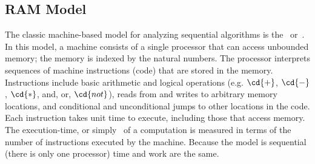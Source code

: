 \subsection{RAM Model}
\label{sec:analysis::models::ram-model}

\begin{cluster}
\label{grp:grm:analysis::models::classic}

\begin{gram}
\label{grm:analysis::models::classic}
The classic machine-based model for analyzing sequential algorithms is
the~ or~.
In this model, a machine consists of a single processor that can
access unbounded memory; the memory is indexed by the natural numbers.
The processor interprets sequences of machine instructions (code) that
are stored in the memory.  Instructions include basic arithmetic and
logical operations (e.g. $\cd{+}$, $\cd{-}$, $\cd{*}$, and, or,
$\cd{not}$), reads from and writes to arbitrary memory locations, and
conditional and unconditional jumps to other locations in the code.
Each instruction takes unit time to execute, including those that
access memory.
The execution-time, or simply~ of a computation is measured
in terms of the number of instructions executed by the machine.
Because the model is sequential (there is only one processor) time
and work are the same.

\end{gram}
\end{cluster}

